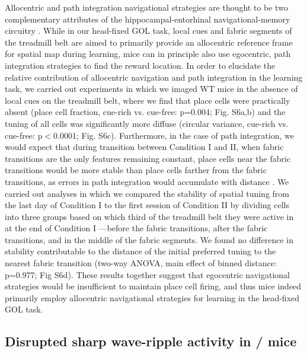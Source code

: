 Allocentric and path integration navigational strategies are thought to be two complementary attributes of the hippocampal-entorhinal navigational-memory circuitry \citep{Buzsaki2013}\citep{Etienne2004}\citep{Gothard1996}\citep{Moser2015}. While in our head-fixed GOL task, local cues and fabric segments of the treadmill belt are aimed to primarily provide an allocentric reference frame for spatial map during learning, mice can in principle also use egocentric, path integration strategies to find the reward location. In order to elucidate the relative contribution of allocentric navigation and path integration in the learning task, we carried out experiments in which we imaged WT mice in the absence of local cues on the treadmill belt, where we find that place cells were practically absent (place cell fraction, cue-rich vs. cue-free: p=0.004; Fig. S6a,b) and the tuning of all cells was significantly more diffuse (circular variance, cue-rich vs. cue-free: p$<$0.0001; Fig. S6c). Furthermore, in the case of path integration, we would expect that during transition between Condition I and II, when fabric transitions are the only features remaining constant, place cells near the fabric transitions would be more stable than place cells farther from the fabric transitions, as errors in path integration would accumulate with distance \citep{Etienne2004}\citep{Gothard1996}. We carried out analyses in which we compared the stability of spatial tuning from the last day of Condition I to the first session of Condition II by dividing cells into three groups based on which third of the treadmill belt they were active in at the end of Condition I —before the fabric transitions, after the fabric transitions, and in the middle of the fabric segments. We found no difference in stability contributable to the distance of the initial preferred tuning to the nearest fabric transition (two-way ANOVA, main effect of binned distance: p=0.977; Fig S6d). These results together suggest that egocentric navigational strategies would be insufficient to maintain place cell firing, and thus mice indeed primarily employ allocentric navigational strategies for learning in the head-fixed GOL task.

\subsection{Disrupted sharp wave-ripple activity in \df/ mice}

